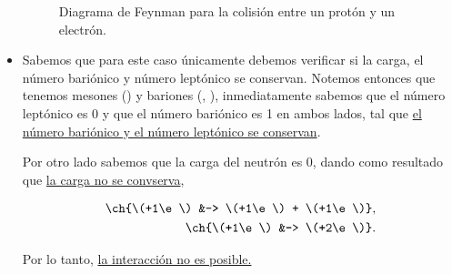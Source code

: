 \documentclass[./../main.tex]{subfiles}
\begin{document}
\begin{exercise}
\begin{solution}
\begin{itemize}
\begin{figure}[htb]
                    \caption{Diagrama de Feynman para la colisión entre un protón y un electrón.}
                    \label{fig:proton-electron-interaction}
                \end{figure}
                
                \item {}
                
                Sabemos que para este caso únicamente debemos verificar si la carga, el número bariónico y número leptónico se conservan. Notemos entonces que tenemos mesones (\ch{\pi+}) y bariones (, ), inmediatamente sabemos que el número leptónico es 0 y que el número bariónico es 1 en ambos lados, tal que \ul{el número bariónico y el número leptónico se conservan}.

                Por otro lado sabemos que la carga del neutrón es 0, dando como resultado que \ul{la carga no se convserva}, \idest

                \begin{align*}
                    \ch{\(+1\e\) &-> \(+1\e\) + \(+1\e\)},\\
                    \ch{\(+1\e\) &-> \(+2\e\)}.
                \end{align*}

                Por lo tanto, \ul{la interacción no es posible.}
            \end{itemize}
        \end{solution}
    \end{exercise}
\end{document}
